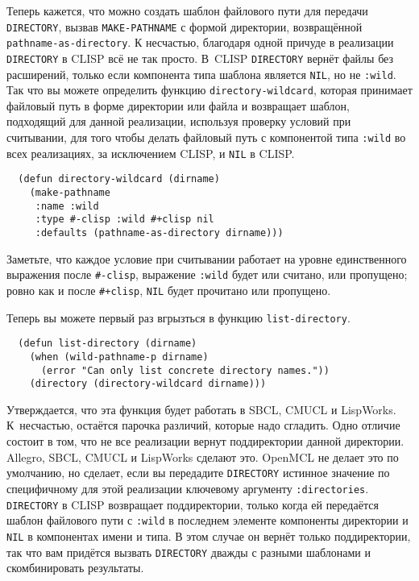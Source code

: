 Теперь кажется, что можно создать шаблон файлового пути для передачи \lstinline{DIRECTORY},
вызвав \lstinline{MAKE-PATHNAME} с формой директории, возвращённой
\lstinline{pathname-as-directory}. К несчастью, благодаря одной причуде в реализации
\lstinline{DIRECTORY} в CLISP всё не так просто. В~CLISP \lstinline{DIRECTORY} вернёт файлы без
расширений, только если компонента типа шаблона является \lstinline{NIL}, но не
\lstinline{:wild}. Так что вы можете определить функцию \lstinline{directory-wildcard}, которая
принимает файловый путь в форме директории или файла и возвращает шаблон, подходящий для
данной реализации, используя проверку условий при считывании, для того чтобы делать
файловый путь с компонентой типа \lstinline{:wild} во всех реализациях, за исключением CLISP, и
\lstinline{NIL} в CLISP.

\begin{lstlisting}
  (defun directory-wildcard (dirname)
    (make-pathname
     :name :wild
     :type #-clisp :wild #+clisp nil
     :defaults (pathname-as-directory dirname)))
\end{lstlisting}

Заметьте, что каждое условие при считывании работает на уровне единственного выражения
после \lstinline!#-clisp!, выражение \lstinline{:wild} будет или считано, или пропущено; ровно
как и после \lstinline!#+clisp!, \lstinline{NIL} будет прочитано или пропущено.

Теперь вы можете первый раз вгрызться в функцию \lstinline{list-directory}.

\begin{lstlisting}
  (defun list-directory (dirname)
    (when (wild-pathname-p dirname)
      (error "Can only list concrete directory names."))
    (directory (directory-wildcard dirname)))
\end{lstlisting}

Утверждается, что эта функция будет работать в SBCL, CMUCL и LispWorks. К~несчастью,
остаётся парочка различий, которые надо сгладить. Одно отличие состоит в том, что не все
реализации вернут поддиректории данной директории. Allegro, SBCL, CMUCL и LispWorks
сделают это. OpenMCL не делает это по умолчанию, но сделает, если вы передадите
\lstinline{DIRECTORY} истинное значение по специфичному для этой реализации ключевому аргументу
\lstinline{:directories}. \lstinline{DIRECTORY} в CLISP возвращает поддиректории, только когда ей
передаётся шаблон файлового пути с \lstinline{:wild} в последнем элементе компоненты директории
и \lstinline{NIL} в компонентах имени и типа. В этом случае он вернёт только поддиректории,
так что вам придётся вызвать \lstinline{DIRECTORY} дважды с разными шаблонами и скомбинировать
результаты.

